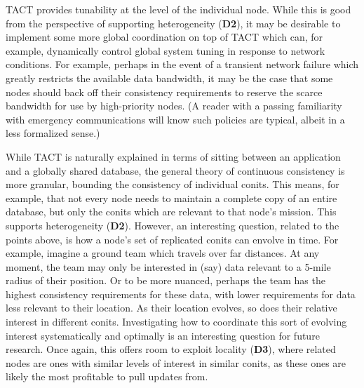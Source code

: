 TACT provides tunability at the level of the individual node. While
this is good from the perspective of supporting heterogeneity
(\textbf{D2}), it may be desirable to implement some more global
coordination on top of TACT which can, for example, dynamically
control global system tuning in response to network conditions. For
example, perhaps in the event of a transient network failure which
greatly restricts the available data bandwidth, it may be the case
that some nodes should back off their consistency requirements to
reserve the scarce bandwidth for use by high-priority nodes. (A reader
with a passing familiarity with emergency communications will know
such policies are typical, albeit in a less formalized sense.)

While TACT is naturally explained in terms of sitting between an
application and a globally shared database, the general theory of
continuous consistency is more granular, bounding the consistency of
individual conits. This means, for example, that not every node needs
to maintain a complete copy of an entire database, but only the conits
which are relevant to that node's mission. This supports heterogeneity
(\textbf{D2}). However, an interesting question, related to the points
above, is how a node's set of replicated conits can envolve in
time. For example, imagine a ground team which travels over far
distances. At any moment, the team may only be interested in (say)
data relevant to a 5-mile radius of their position. Or to be more
nuanced, perhaps the team has the highest consistency requirements for
these data, with lower requirements for data less relevant to their
location. As their location evolves, so does their relative interest
in different conits. Investigating how to coordinate this sort of
evolving interest systematically and optimally is an interesting
question for future research. Once again, this offers room to exploit
locality (\textbf{D3}), where related nodes are ones with similar
levels of interest in similar conits, as these ones are likely the
most profitable to pull updates from.
